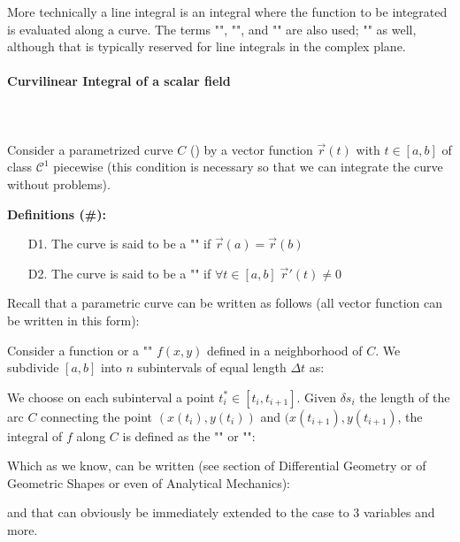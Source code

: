 	More technically a line integral is an integral where the function to be integrated is evaluated along a curve. The terms "", "", and "" are also used; "" as well, although that is typically reserved for line integrals in the complex plane.
	
	\paragraph{Curvilinear Integral of a scalar field}\mbox{}\\\\
	Consider a parametrized curve $C$ () by a vector function $\vec{r}(t)$ with $t \in [a,b]$ of class $\mathcal{C}^1$ piecewise (this condition is necessary so that we can integrate the curve without problems).
	
	\textbf{Definitions (\#\mydef):}
	 \begin{enumerate}
	 	\item[D1.] The curve is said to be a "" if $\vec{r}(a)=\vec{r}(b)$
	 	
	 	\item[D2.] The curve is said to be a "" if $\forall t \in [a,b]\; \vec{r}'(t)\neq 0$
	 \end{enumerate}
	 Recall that a parametric curve can be written as follows (all vector function can be written in this form):
	 
	Consider a function or a "" $f(x,y)$ defined in a neighborhood of $C$. We subdivide $[a,b]$ into $n$ subintervals of equal length $\Delta t$ as:
	
	We choose on each subinterval a point $t_i^*\in [t_i,t_{i+1}]$. Given $\delta s_i$ the length of the arc $C$ connecting the point $(x(t_i),y(t_i))$ and $(x(t_{i+1}),y(t_{i+1})$, the integral of $f$ along $C$ is defined as the "" or "":
	
	Which as we know, can be written (see section of Differential Geometry or of Geometric Shapes or even of Analytical Mechanics):
	
	and that can obviously be immediately extended to the case to 3 variables and more.
	
